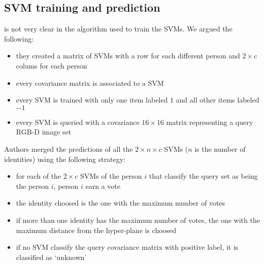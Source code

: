 \documentclass{article}
\begin{document}
\subsection{SVM training and prediction}
\label{sec:training}
\cite{Hayat2016} is not very clear in the algorithm used to train
the SVMs. We argued the following:
\begin{itemize}
	\item they created a matrix of SVMs with a row for each different person
		and $2\times c$ colums for each person
	\item every covariance matrix is associated to a SVM
	\item every SVM is trained with only one item labeled $1$ and all other
		items labeled $-1$
	\item every SVM is queried with a covariance $16\times 16$ matrix representing
		a query RGB-D image set
\end{itemize}
Authors merged the predictions of all the $2\times n \times c$ SVMs ($n$ is the number of
identities) using the following strategy:
\begin{itemize}
	\item for each of the $2\times c$ SVMs of the person $i$ that classify the
		query set as being the person $i$, person $i$ earn a vote
	\item the identity choosed is the one with the maximum number of votes
	\item if more than one identity has the maximum number of votes, the
		one with the maximum distance from the hyper-plane is choosed
	\item if no SVM classify the query covariance matrix with positive label,
		it is classified as `unknown'
\end{itemize}
\end{document}
